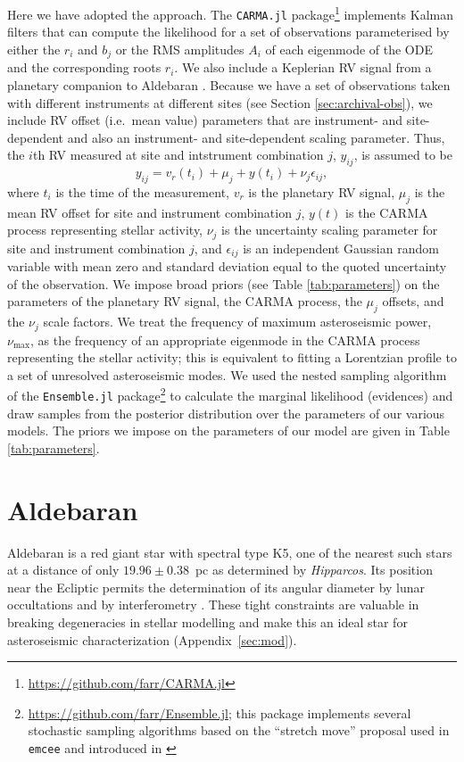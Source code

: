 \documentclass[modern]{aastex61}
\newcommand{\hipparcos}{\emph{Hipparcos}\xspace}
\begin{document}
Here we have adopted the \citet{Kelly2014} approach.  The \texttt{CARMA.jl}
package\footnote{\url{https://github.com/farr/CARMA.jl}} implements Kalman
filters that can compute the likelihood for a set of observations parameterised
by either the $r_i$ and $b_j$ or the RMS amplitudes $A_i$ of each eigenmode of
the ODE and the corresponding roots $r_i$.  We also include a Keplerian RV
signal from a planetary companion to Aldebaran \citep{Hatzes2015,Gregory2005}.
Because we have a set of observations taken with different instruments at
different sites (see Section \ref{sec:archival-obs}), we include RV offset
(i.e.\ mean value) parameters that are instrument- and site-dependent and also
an instrument- and site-dependent scaling parameter.  Thus, the $i$th RV
measured at site and intstrument combination $j$, $y_{ij}$, is assumed to be
%
\begin{equation}
  \label{eq:RV-model}
  y_{ij} = v_r\left(t_i\right) + \mu_j + y\left( t_i \right) + \nu_j
\epsilon_{ij},
\end{equation}
%
where $t_i$ is the time of the measurement, $v_r$ is the planetary RV signal,
$\mu_j$ is the mean RV offset for site and instrument combination $j$, $y(t)$ is
the CARMA process representing stellar activity, $\nu_j$ is the uncertainty
scaling parameter for site and instrument combination $j$, and $\epsilon_{ij}$
is an independent Gaussian random variable with mean zero and standard deviation
equal to the quoted uncertainty of the observation.  We impose broad priors (see
Table \ref{tab:parameters}) on the parameters of the planetary RV signal, the
CARMA process, the $\mu_j$ offsets, and the $\nu_j$ scale factors.  We treat the
frequency of maximum asteroseismic power, $\nu_\mathrm{max}$, as the frequency
of an appropriate eigenmode in the CARMA process representing the stellar
activity; this is equivalent to fitting a Lorentzian profile to a set of
unresolved asteroseismic modes.  We used the nested sampling algorithm of the
\texttt{Ensemble.jl} package\footnote{\url{https://github.com/farr/Ensemble.jl};
this package implements several stochastic sampling algorithms based on the
``stretch move'' proposal used in \texttt{emcee} \citep{Foreman-Mackey2013} and
introduced in \citet{Goodman2010}} to calculate the marginal likelihood
(evidences) and draw samples from the posterior distribution over the parameters
of our various models.  The priors we impose on the parameters of our model are given in Table \ref{tab:parameters}.

\section{Aldebaran}
Aldebaran is a red giant star with spectral type K5, one of the nearest such stars at a distance of only $19.96 \pm 0.38$~pc as determined by \hipparcos \citep{hipparcos}. Its position near the Ecliptic permits the determination of its angular diameter by lunar occultations and by interferometry \citep[$20.58 \pm 0.03$ mas;][]{richichi2005,1979ApJ...228L.111B,brown1979,panek1980}. These tight constraints are valuable in breaking degeneracies in stellar modelling and make this an ideal star for asteroseismic characterization (Appendix~\ref{sec:mod}).
\end{document}
